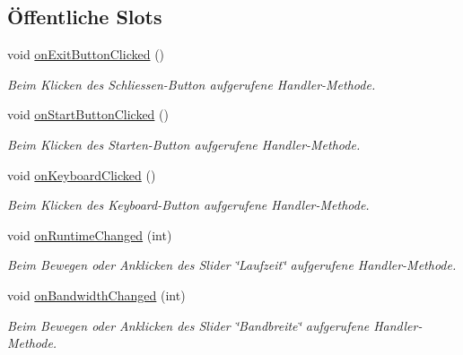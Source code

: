 \subsection*{Öffentliche Slots}
\begin{DoxyCompactItemize}
\item 
\hypertarget{class_client_a5f96334ebe2c8a22f6448cff80d027a5}{}\label{class_client_a5f96334ebe2c8a22f6448cff80d027a5} 
void \hyperlink{class_client_a5f96334ebe2c8a22f6448cff80d027a5}{on\+Exit\+Button\+Clicked} ()
\begin{DoxyCompactList}\small\item\em Beim Klicken des Schliessen-\/\+Button aufgerufene Handler-\/\+Methode. \end{DoxyCompactList}\item 
\hypertarget{class_client_aa56b217ce77d6e41f76474ed92378798}{}\label{class_client_aa56b217ce77d6e41f76474ed92378798} 
void \hyperlink{class_client_aa56b217ce77d6e41f76474ed92378798}{on\+Start\+Button\+Clicked} ()
\begin{DoxyCompactList}\small\item\em Beim Klicken des Starten-\/\+Button aufgerufene Handler-\/\+Methode. \end{DoxyCompactList}\item 
\hypertarget{class_client_a548c8d8b2eb95c3ecbec190495940b99}{}\label{class_client_a548c8d8b2eb95c3ecbec190495940b99} 
void \hyperlink{class_client_a548c8d8b2eb95c3ecbec190495940b99}{on\+Keyboard\+Clicked} ()
\begin{DoxyCompactList}\small\item\em Beim Klicken des Keyboard-\/\+Button aufgerufene Handler-\/\+Methode. \end{DoxyCompactList}\item 
\hypertarget{class_client_a8dbb1b513ea96c6016e97cb03d4e6b0d}{}\label{class_client_a8dbb1b513ea96c6016e97cb03d4e6b0d} 
void \hyperlink{class_client_a8dbb1b513ea96c6016e97cb03d4e6b0d}{on\+Runtime\+Changed} (int)
\begin{DoxyCompactList}\small\item\em Beim Bewegen oder Anklicken des Slider \char`\"{}\+Laufzeit\char`\"{} aufgerufene Handler-\/\+Methode. \end{DoxyCompactList}\item 
\hypertarget{class_client_afe033bbce94884369c9b488485f879ad}{}\label{class_client_afe033bbce94884369c9b488485f879ad} 
void \hyperlink{class_client_afe033bbce94884369c9b488485f879ad}{on\+Bandwidth\+Changed} (int)
\begin{DoxyCompactList}\small\item\em Beim Bewegen oder Anklicken des Slider \char`\"{}\+Bandbreite\char`\"{} aufgerufene Handler-\/\+Methode. \end{DoxyCompactList}\item 

\end{DoxyCompactItemize}
